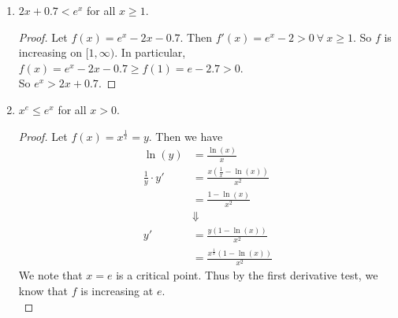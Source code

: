 \documentclass[12pt,letterpaper]{article}
\newcommand{\st}{\ \text{s.t.}\ }
\newcommand{\R}{\mathbb{R}}
\theoremstyle{case}
\theoremstyle{definition}
\begin{document}
\begin{enumerate}
\begin{enumerate}
\begin{proof}
				For the case where $f:(-\infty,0) \to \R$, we have that $f'(x)=e^x \leq 1\ \forall\ x \in (-\infty, 0)$. Now, by the \textit{Mean Value Theorem}, we know that $\exists\ c \in (-\infty, 0) \st f'(c)=\frac{f(0)-f(x)}{0-x} = \frac{1-e^x}{-x}$. Thus we have that $1-e^x = f'(c) \cdot -x \leq 1$, which implies that $e^x-1=x\cdot-f'(c) \geq -1$. Thus $1+ x \leq e^x$.\\
			\end{proof}
			
			\item $2x+0.7<e^x$ for all $x \geq 1$. \\
			
			\begin{proof}
				Let $f(x)=e^x-2x-0.7$. Then $f'(x)=e^x-2>0\ \forall\ x \geq 1$. So $f$ is increasing on $[1,\infty)$. In particular, $f(x)=e^x-2x-0.7 \geq f(1) = e-2.7 > 0$.\\
				
				So $e^x>2x+0.7$.
			\end{proof}
			
			\item $x^e \leq e^x$ for all $x > 0$.\\
			
			\begin{proof}
				Let $f(x)=x^{\frac{1}{x}}=y$. Then we have
				\begin{align*}
					\ln(y) &= \frac{\ln(x)}{x} \\
					\frac{1}{y}\cdot y' &= \frac{x\left(\frac{1}{x}-\ln(x)\right)}{x^2} \\
					&=\frac{1-\ln(x)}{x^2} \\
					&\Downarrow \\
					y' &= \frac{y(1-\ln(x))}{x^2} \\
					&= \frac{x^{\frac{1}{x}}(1-\ln(x))}{x^2}
				\end{align*}
				We note that $x=e$ is a critical point. Thus by the first derivative test, we know that $f$ is increasing at $e$.\\
				

\end{proof}
\end{enumerate}
\end{enumerate}
\end{document}
